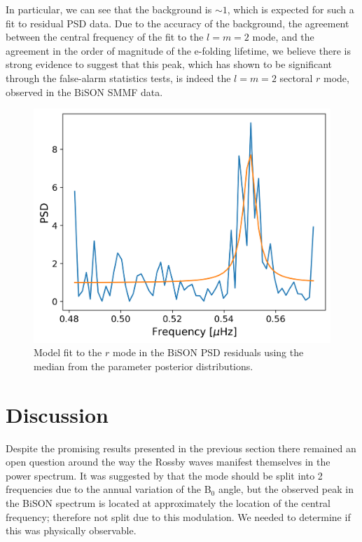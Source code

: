In particular, we can see that the background is $\sim 1$, which is expected for such a fit to residual PSD data. Due to the accuracy of the background, the agreement between the central frequency of the fit to the $l=m=2$ mode, and the agreement in the order of magnitude of the e-folding lifetime, we believe there is strong evidence to suggest that this peak, which has shown to be significant through the false-alarm statistics tests, is indeed the $l=m=2$ sectoral $r$ mode, observed in the BiSON SMMF data.


\begin{figure}[!ht]
	\centering
	\includegraphics[width=0.65\columnwidth]{asymm_r-mode_model_fit.png}
	\caption{Model fit to the $r$ mode in the BiSON PSD residuals using the median from the parameter posterior distributions.}  \label{fig:rmode_asymm_fit}
\end{figure}




\section{Discussion}\label{sec:r-mode_discussion}


Despite the promising results presented in the previous section there remained an open question around the way the Rossby waves manifest themselves in the power spectrum. It was suggested by \citet{lanza_sectoral_2019} that the mode should be split into 2 frequencies due to the annual variation of the B$_0$ angle, but the observed peak in the BiSON spectrum is located at approximately the location of the central frequency; therefore not split due to this modulation. We needed to determine if this was physically observable.

